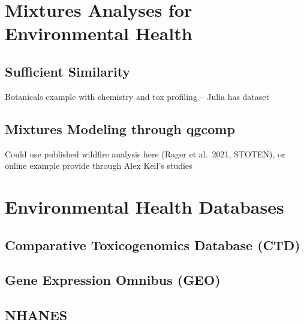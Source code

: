\documentclass[
]{article}
\begin{document}
\hypertarget{mixtures-analyses-for-environmental-health}{%
\section{Mixtures Analyses for Environmental Health}\label{mixtures-analyses-for-environmental-health}}

\hypertarget{sufficient-similarity}{%
\subsection{Sufficient Similarity}\label{sufficient-similarity}}

Botanicals example with chemistry and tox profiling -- Julia has dataset

\hypertarget{mixtures-modeling-through-qgcomp}{%
\subsection{Mixtures Modeling through qgcomp}\label{mixtures-modeling-through-qgcomp}}

Could use published wildfire analysis here (Rager et al.~2021, STOTEN), or online example provide through Alex Keil's studies

\hypertarget{environmental-health-databases}{%
\section{Environmental Health Databases}\label{environmental-health-databases}}

\hypertarget{comparative-toxicogenomics-database-ctd}{%
\subsection{Comparative Toxicogenomics Database (CTD)}\label{comparative-toxicogenomics-database-ctd}}

\hypertarget{gene-expression-omnibus-geo}{%
\subsection{Gene Expression Omnibus (GEO)}\label{gene-expression-omnibus-geo}}

\hypertarget{nhanes}{%
\subsection{NHANES}\label{nhanes}}
\end{document}

